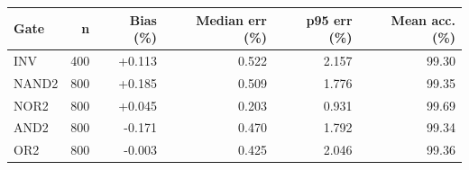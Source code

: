 \begin{tabular}{lrrrrr}
\hline
Gate & n & Bias (\%) & Median err (\%) & p95 err (\%) & Mean acc. (\%) \\
\hline
INV & 400 & +0.113 & 0.522 & 2.157 & 99.30 \\
NAND2 & 800 & +0.185 & 0.509 & 1.776 & 99.35 \\
NOR2 & 800 & +0.045 & 0.203 & 0.931 & 99.69 \\
AND2 & 800 & -0.171 & 0.470 & 1.792 & 99.34 \\
OR2 & 800 & -0.003 & 0.425 & 2.046 & 99.36 \\
\hline
\end{tabular}
